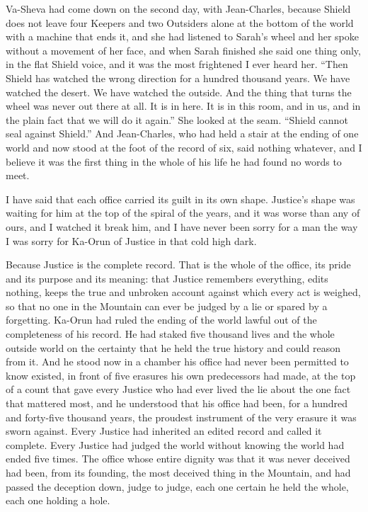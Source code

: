 Va-Sheva had come down on the second day, with Jean-Charles, because Shield does not leave four Keepers and two Outsiders alone at the bottom of the world with a machine that ends it, and she had listened to Sarah's wheel and her spoke without a movement of her face, and when Sarah finished she said one thing only, in the flat Shield voice, and it was the most frightened I ever heard her. ``Then Shield has watched the wrong direction for a hundred thousand years. We have watched the desert. We have watched the outside. And the thing that turns the wheel was never out there at all. It is in here. It is in this room, and in us, and in the plain fact that we will do it again.'' She looked at the seam. ``Shield cannot seal against Shield.'' And Jean-Charles, who had held a stair at the ending of one world and now stood at the foot of the record of six, said nothing whatever, and I believe it was the first thing in the whole of his life he had found no words to meet.\par

\ornament

I have said that each office carried its guilt in its own shape. Justice's shape was waiting for him at the top of the spiral of the years, and it was worse than any of ours, and I watched it break him, and I have never been sorry for a man the way I was sorry for Ka-Orun of Justice in that cold high dark.\par

Because Justice is the complete record. That is the whole of the office, its pride and its purpose and its meaning: that Justice remembers everything, edits nothing, keeps the true and unbroken account against which every act is weighed, so that no one in the Mountain can ever be judged by a lie or spared by a forgetting. Ka-Orun had ruled the ending of the world lawful out of the completeness of his record. He had staked five thousand lives and the whole outside world on the certainty that he held the true history and could reason from it. And he stood now in a chamber his office had never been permitted to know existed, in front of five erasures his own predecessors had made, at the top of a count that gave every Justice who had ever lived the lie about the one fact that mattered most, and he understood that his office had been, for a hundred and forty-five thousand years, the proudest instrument of the very erasure it was sworn against. Every Justice had inherited an edited record and called it complete. Every Justice had judged the world without knowing the world had ended five times. The office whose entire dignity was that it was never deceived had been, from its founding, the most deceived thing in the Mountain, and had passed the deception down, judge to judge, each one certain he held the whole, each one holding a hole.\par

